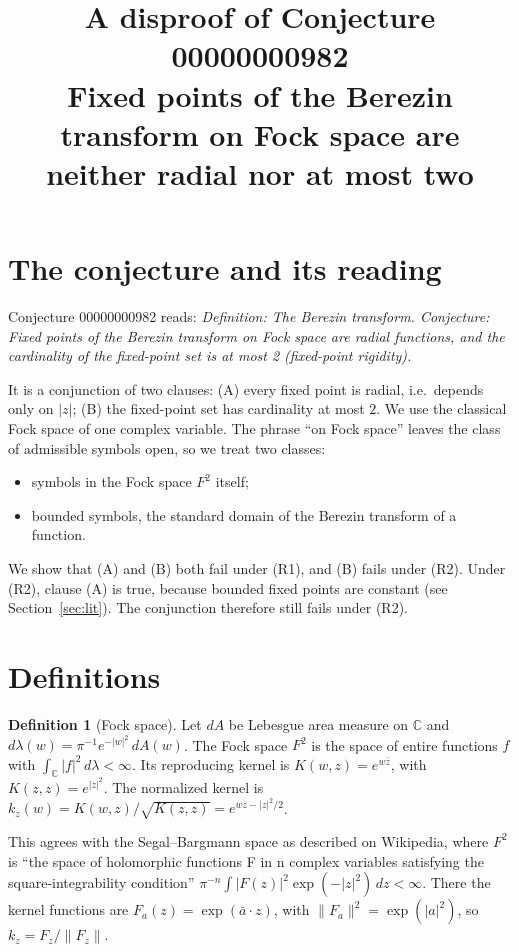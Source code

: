 \documentclass[11pt]{article}
\title{A disproof of Conjecture 00000000982\\[2pt]
\large Fixed points of the Berezin transform on Fock space are neither radial nor at most two}
\date{}
\renewcommand{\_}{\oldus\allowbreak}
\theoremstyle{definition}
\newtheorem{definition}[theorem]{Definition}
\theoremstyle{remark}
\newcommand{\C}{\mathbb{C}}
\begin{document}
\sloppy
\maketitle

\section{The conjecture and its reading}

Conjecture 00000000982 reads: \emph{Definition: The Berezin transform. Conjecture: Fixed points of the
Berezin transform on Fock space are radial functions, and the cardinality of the fixed-point set is at
most 2 (fixed-point rigidity).}

It is a conjunction of two clauses: (A) every fixed point is radial, i.e.\ depends only on $|z|$;
(B) the fixed-point set has cardinality at most $2$. We use the classical Fock space of one complex
variable. The phrase ``on Fock space'' leaves the class of admissible symbols open, so we treat two classes:
\begin{itemize}
\item[(R1)] symbols in the Fock space $F^2$ itself;
\item[(R2)] bounded symbols, the standard domain of the Berezin transform of a function.
\end{itemize}
We show that (A) and (B) both fail under (R1), and (B) fails under (R2). Under (R2), clause (A) is true,
because bounded fixed points are constant (see Section~\ref{sec:lit}). The conjunction therefore still
fails under (R2).

\section{Definitions}

\begin{definition}[Fock space]
Let $dA$ be Lebesgue area measure on $\C$ and $d\lambda(w)=\pi^{-1}e^{-|w|^2}\,dA(w)$. The Fock space
$F^2$ is the space of entire functions $f$ with $\int_\C |f|^2\,d\lambda<\infty$. Its reproducing kernel
is $K(w,z)=e^{w\bar z}$, with $K(z,z)=e^{|z|^2}$. The normalized kernel is
$k_z(w)=K(w,z)/\sqrt{K(z,z)}=e^{w\bar z-|z|^2/2}$.
\end{definition}

This agrees with the Segal--Bargmann space as described on Wikipedia, where $F^2$ is ``the space of
holomorphic functions F in n complex variables satisfying the square-integrability condition''
$\pi^{-n}\int|F(z)|^2\exp(-|z|^2)\,dz<\infty$. There the kernel functions are $F_a(z)=\exp(\bar a\cdot z)$,
with $\|F_a\|^2=\exp(|a|^2)$, so $k_z=F_z/\|F_z\|$.
\end{document}

